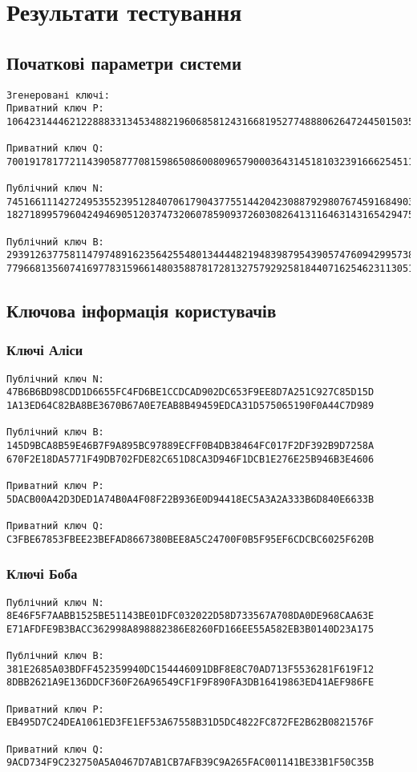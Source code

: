 \documentclass{article}
\begin{document}
\section{Результати тестування}

\subsection{Початкові параметри системи}
\begin{verbatim}
Згенеровані ключі:
Приватний ключ P: 
106423144462122888331345348821960685812431668195277488806264724450150352770927

Приватний ключ Q: 
70019178177211439058777081598650860080965790003643145181032391666254511915867

Публічний ключ N: 
745166111427249535523951284070617904377551442042308879298076745916849035275213
182718995796042494690512037473206078590937260308264131164631431654294759870

Публічний ключ B: 
293912637758114797489162356425548013444482194839879543905747609429957386168706
779668135607416977831596614803588781728132757929258184407162546231130518502
\end{verbatim}

\subsection{Ключова інформація користувачів}
\subsubsection{Ключі Аліси}
\begin{verbatim}
Публічний ключ N:
47B6B6BD98CDD1D6655FC4FD6BE1CCDCAD902DC653F9EE8D7A251C927C85D15D
1A13ED64C82BA8BE3670B67A0E7EAB8B49459EDCA31D575065190F0A44C7D989

Публічний ключ B:
145D9BCA8B59E46B7F9A895BC97889ECFF0B4DB38464FC017F2DF392B9D7258A
670F2E18DA5771F49DB702FDE82C651D8CA3D946F1DCB1E276E25B946B3E4606

Приватний ключ P:
5DACB00A42D3DED1A74B0A4F08F22B936E0D94418EC5A3A2A333B6D840E6633B

Приватний ключ Q:
C3FBE67853FBEE23BEFAD8667380BEE8A5C24700F0B5F95EF6CDCBC6025F620B
\end{verbatim}

\subsubsection{Ключі Боба}
\begin{verbatim}
Публічний ключ N:
8E46F5F7AABB1525BE51143BE01DFC032022D58D733567A708DA0DE968CAA63E
E71AFDFE9B3BACC362998A898882386E8260FD166EE55A582EB3B0140D23A175

Публічний ключ B:
381E2685A03BDFF452359940DC154446091DBF8E8C70AD713F5536281F619F12
8DBB2621A9E136DDCF360F26A96549CF1F9F890FA3DB16419863ED41AEF986FE

Приватний ключ P:
EB495D7C24DEA1061ED3FE1EF53A67558B31D5DC4822FC872FE2B62B0821576F

Приватний ключ Q:
9ACD734F9C232750A5A0467D7AB1CB7AFB39C9A265FAC001141BE33B1F50C35B
\end{verbatim}
\end{document}
